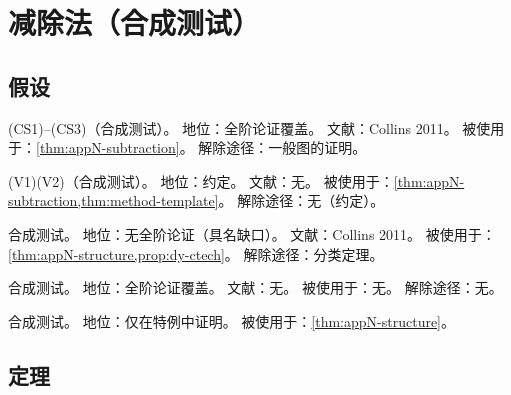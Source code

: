 \chapter{减除法（合成测试）}\label{app:appN}

\section{假设}\label{sec:appN-asm}

\begin{assumption}\label{asm:appN-collins}
(CS1)--(CS3)（合成测试）。
地位：全阶论证覆盖。
文献：Collins 2011。
被使用于：\cref{thm:appN-subtraction}。
解除途径：一般图的证明。
\end{assumption}

\begin{assumption}[取值规则]\label{asm:appN-values}
(V1)(V2)（合成测试）。
地位：约定。
文献：无。
被使用于：\cref{thm:appN-subtraction,thm:method-template}。
解除途径：无（约定）。
\end{assumption}

\begin{assumption}\label{asm:appN-brst-nonlocal}
合成测试。
地位：无全阶论证（具名缺口）。
文献：Collins 2011。
被使用于：\cref{thm:appN-structure,prop:dy-ctech}。
解除途径：分类定理。
\end{assumption}

\begin{assumption}\label{asm:appN-unused}
合成测试。
地位：全阶论证覆盖。
文献：无。
被使用于：无。
解除途径：无。
\end{assumption}

\begin{assumption}\label{asm:appN-wrongtag}
合成测试。
地位：仅在特例中证明。
被使用于：\cref{thm:appN-structure}。
\end{assumption}

\section{定理}\label{sec:appN-thm}


